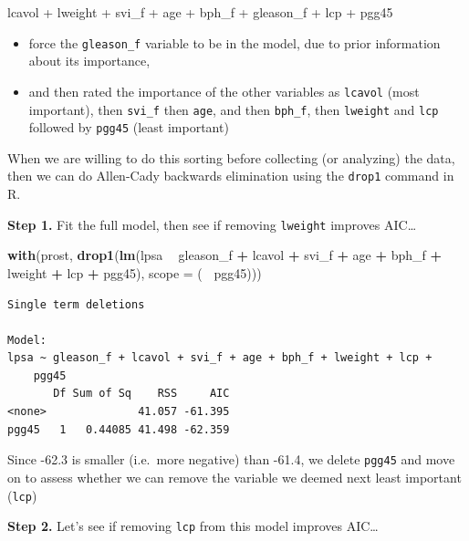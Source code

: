 \documentclass[]{book}
\newenvironment{Shaded}{\begin{snugshade}}{\end{snugshade}}
\newcommand{\KeywordTok}[1]{\textcolor[rgb]{0.13,0.29,0.53}{\textbf{#1}}}
\newcommand{\DataTypeTok}[1]{\textcolor[rgb]{0.13,0.29,0.53}{#1}}
\newcommand{\StringTok}[1]{\textcolor[rgb]{0.31,0.60,0.02}{#1}}
\newcommand{\OperatorTok}[1]{\textcolor[rgb]{0.81,0.36,0.00}{\textbf{#1}}}
\newcommand{\NormalTok}[1]{#1}
\providecommand{\tightlist}{%
  \setlength{\itemsep}{0pt}\setlength{\parskip}{0pt}}
\theoremstyle{definition}
\theoremstyle{definition}
\theoremstyle{definition}
\theoremstyle{remark}
\begin{document}
lcavol + lweight + svi\_f + age + bph\_f + gleason\_f + lcp + pgg45

\begin{itemize}
\tightlist
\item
  force the \texttt{gleason\_f} variable to be in the model, due to
  prior information about its importance,
\item
  and then rated the importance of the other variables as
  \texttt{lcavol} (most important), then \texttt{svi\_f} then
  \texttt{age}, and then \texttt{bph\_f}, then \texttt{lweight} and
  \texttt{lcp} followed by \texttt{pgg45} (least important)
\end{itemize}

When we are willing to do this sorting before collecting (or analyzing)
the data, then we can do Allen-Cady backwards elimination using the
\texttt{drop1} command in R.

\textbf{Step 1.} Fit the full model, then see if removing
\texttt{lweight} improves AIC\ldots{}

\begin{Shaded}
\begin{Highlighting}[]
\KeywordTok{with}\NormalTok{(prost, }\KeywordTok{drop1}\NormalTok{(}\KeywordTok{lm}\NormalTok{(lpsa }\OperatorTok{~}\StringTok{ }\NormalTok{gleason_f }\OperatorTok{+}\StringTok{ }\NormalTok{lcavol }\OperatorTok{+}\StringTok{ }\NormalTok{svi_f }\OperatorTok{+}\StringTok{ }
\StringTok{              }\NormalTok{age }\OperatorTok{+}\StringTok{ }\NormalTok{bph_f }\OperatorTok{+}\StringTok{ }\NormalTok{lweight }\OperatorTok{+}\StringTok{ }\NormalTok{lcp }\OperatorTok{+}\StringTok{ }\NormalTok{pgg45),}
              \DataTypeTok{scope =}\NormalTok{ (}\OperatorTok{~}\StringTok{ }\NormalTok{pgg45)))}
\end{Highlighting}
\end{Shaded}

\begin{verbatim}
Single term deletions

Model:
lpsa ~ gleason_f + lcavol + svi_f + age + bph_f + lweight + lcp + 
    pgg45
       Df Sum of Sq    RSS     AIC
<none>              41.057 -61.395
pgg45   1   0.44085 41.498 -62.359
\end{verbatim}

Since -62.3 is smaller (i.e.~more negative) than -61.4, we delete
\texttt{pgg45} and move on to assess whether we can remove the variable
we deemed next least important (\texttt{lcp})

\textbf{Step 2.} Let's see if removing \texttt{lcp} from this model
improves AIC\ldots{}
\end{document}
